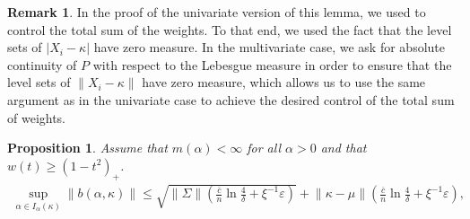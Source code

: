 \documentclass{article}
\theoremstyle{plain}
\newtheorem{lemma}[theorem]{Lemma}
\newtheorem{proposition}[theorem]{Proposition}
\theoremstyle{definition}
\newtheorem{remark}{Remark}
\def\eps{\varepsilon}
\newcommand{\E}{\mathbb{E}} %
\renewcommand{\Pr}{\mathbb{P}}
\def\sA{\mathcal{A}}
\begin{document}
\begin{appendix}
\begin{remark}
  In the proof of the univariate version of this lemma, we used  to control the total sum of the weights. To that end, we used the fact that the level sets of \( \lvert X_i - \kappa  \rvert \) have zero measure. In the multivariate case, we ask for absolute continuity of \( P \) with respect to the Lebesgue measure in order to ensure that the level sets of \( \lVert X_i - \kappa  \rVert  \) have zero measure, which allows us to use the same argument as in the univariate case to achieve the desired control of the total sum of weights.
\end{remark}
\begin{proposition}\label{prop:bias_order_multivariate}
Assume that \( m(\alpha )< \infty \) for all \( \alpha >0 \) and that \( w(t)\ge (1-t^2)_+ \).   
	\begin{gather*}
    \sup_{\alpha \in I_\alpha (\kappa )}\lVert b(\alpha,\kappa )\rVert\le \sqrt{\lVert \Sigma \rVert \left(\frac{\overline{c}}{n} \ln \frac{4}{\delta } + \xi^{-1}\varepsilon \right) } + \lVert \kappa -\mu \rVert \left(\frac{\overline{c}}{n} \ln \frac{4}{\delta } + \xi^{-1}\varepsilon \right) , \\

\end{gather*}
\end{proposition}
\end{appendix}
\end{document}
